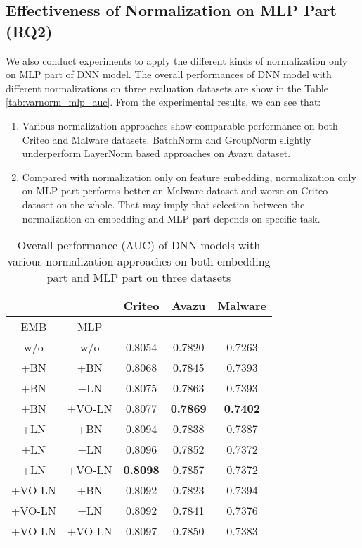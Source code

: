 \documentclass[sigconf]{acmart}
\begin{document}
\subsection{Effectiveness of Normalization on MLP Part (RQ2)}
We also conduct experiments to apply the different kinds of normalization only on MLP part of DNN model. The overall performances of DNN model with different normalizations on three evaluation datasets are show in the Table \ref{tab:varnorm_mlp_auc}. From the experimental results, we can see that:
\begin{enumerate}
  \item Various normalization approaches show comparable performance on both Criteo and Malware datasets. BatchNorm and GroupNorm slightly underperform LayerNorm based approaches on Avazu dataset.
  \item Compared with normalization only on feature embedding,  normalization only on MLP part performs better on Malware dataset and worse on Criteo dataset on the whole. That may imply that selection between the normalization on embedding and MLP part depends on specific task.
\end{enumerate}





\begin{table}
  \caption{Overall performance (AUC) of DNN models with various normalization approaches on both embedding part and MLP part on three datasets}
  \begin{tabular}{cc|ccc}
    \toprule
    &
    &
    Criteo &
    Avazu &
     Malware \\
     \midrule
         EMB &
       MLP &&&\\
       \midrule
    w/o & w/o & 0.8054 &
    0.7820  &
    0.7263 \\

         +BN &
       +BN &
    0.8068 &
    0.7845 &
    0.7393 \\
        +BN &
       +LN &
    0.8075 &
    0.7863 &
    0.7393 \\
        +BN &
       +VO-LN &
    0.8077 &
    \textbf{0.7869} &
    \textbf{0.7402} \\
        +LN &
       +BN &
    0.8094 &
    0.7838 &
    0.7387 \\
       +LN &
       +LN &
    0.8096 &
    0.7852 &
    0.7372 \\
       +LN  &
       +VO-LN  &
    \textbf{0.8098} &
    0.7857 &
    0.7372 \\
    +VO-LN &
       +BN &
    0.8092 &
    0.7823 &
    0.7394 \\
    +VO-LN &
      +LN  &
    0.8092 &
    0.7841 &
    0.7376 \\
    +VO-LN &
       +VO-LN  &
    0.8097  &
    0.7850 &
    0.7383 \\
    \bottomrule
  \end{tabular}
  \label{tab:varnorm_emb_mlp_auc}
\end{table}
\end{document}
